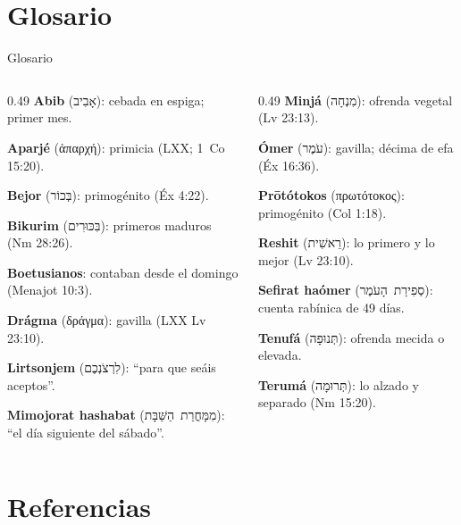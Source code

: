 \documentclass[hyperref={bookmarks=false},aspectratio=169]{beamer}
\newcommand{\heb}[1]{\mbox{\foreignlanguage{hebrew}{#1}}}
\newcommand{\grc}[1]{\foreignlanguage{ancientgreek}{#1}}
\begin{document}
\section{Glosario}

\begin{frame}{Glosario}
\scriptsize
\begin{columns}[t,onlytextwidth]
\begin{column}{0.49\textwidth}\RaggedRight
\textbf{Abib} (\heb{אָבִיב}): cebada en espiga; primer mes.\par
\textbf{Aparjé} (\grc{ἀπαρχή}): primicia (LXX; 1~Co 15:20).\par
\textbf{Bejor} (\heb{בְּכוֹר}): primogénito (Éx 4:22).\par
\textbf{Bikurim} (\heb{בִּכּוּרִים}): primeros maduros (Nm 28:26).\par
\textbf{Boetusianos}: contaban desde el domingo (Menajot 10:3).\par
\textbf{Drágma} (\grc{δράγμα}): gavilla (LXX Lv 23:10).\par
\textbf{Lirtsonjem} (\heb{לִרְצֹנְכֶם}): ``para que seáis aceptos''.\par
\textbf{Mimojorat hashabat} (\heb{מִמָּחֳרַת הַשַּׁבָּת}): ``el día siguiente del sábado''.
\end{column}
\begin{column}{0.49\textwidth}\RaggedRight
\textbf{Minjá} (\heb{מִנְחָה}): ofrenda vegetal (Lv 23:13).\par
\textbf{Ómer} (\heb{עֹמֶר}): gavilla; décima de efa (Éx 16:36).\par
\textbf{Prōtótokos} (\grc{πρωτότοκος}): primogénito (Col 1:18).\par
\textbf{Reshit} (\heb{רֵאשִׁית}): lo primero y lo mejor (Lv 23:10).\par
\textbf{Sefirat haómer} (\heb{סְפִירַת הָעֹמֶר}): cuenta rabínica de 49 días.\par
\textbf{Tenufá} (\heb{תְּנוּפָה}): ofrenda mecida o elevada.\par
\textbf{Terumá} (\heb{תְּרוּמָה}): lo alzado y separado (Nm 15:20).
\end{column}
\end{columns}
\end{frame}

\section{Referencias}
\end{document}
